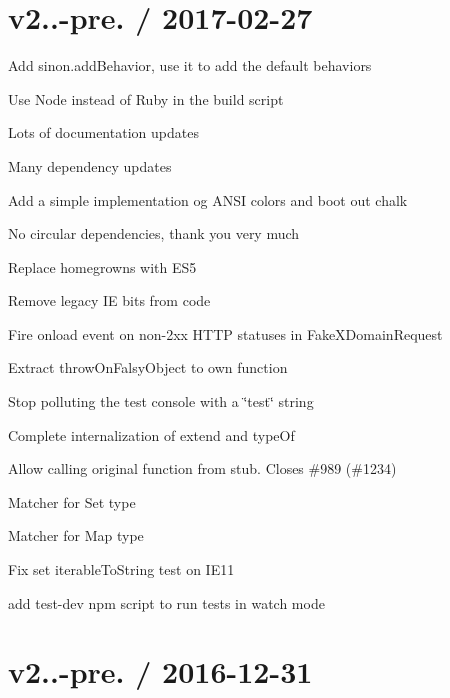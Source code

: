 \section*{v2..-\/pre. / 2017-\/02-\/27 }


\begin{DoxyItemize}
\item Add sinon.\+add\+Behavior, use it to add the default behaviors
\item Use Node instead of Ruby in the build script
\item Lots of documentation updates
\item Many dependency updates
\item Add a simple implementation og A\+N\+SI colors and boot out chalk
\item No circular dependencies, thank you very much
\item Replace homegrowns with E\+S5
\item Remove legacy IE bits from code
\item Fire onload event on non-\/2xx H\+T\+TP statuses in Fake\+X\+Domain\+Request
\item Extract throw\+On\+Falsy\+Object to own function
\item Stop polluting the test console with a \char`\"{}test\char`\"{} string
\item Complete internalization of {\ttfamily extend} and {\ttfamily type\+Of}
\item Allow calling original function from stub. Closes \#989 (\#1234)
\item Matcher for Set type
\item Matcher for Map type
\item Fix set iterable\+To\+String test on I\+E11
\item add test-\/dev npm script to run tests in watch mode
\end{DoxyItemize}

\section*{v2..-\/pre. / 2016-\/12-\/31 }


